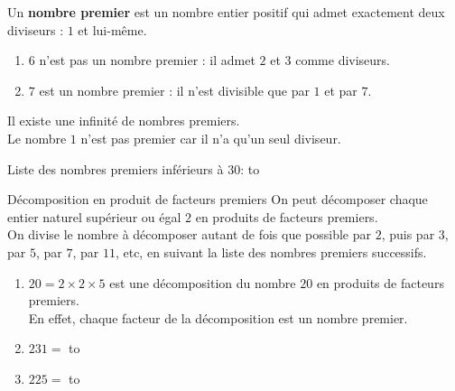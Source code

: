 \documentclass[12pt]{article}
\newif\iftrou\troutrue
\newlength{\trouwidth}
\newcommand{\trou}[1]{%
	\iftrou%
	\settowidth{\trouwidth}{#1}%
	\hbox to \trouwidth{\dotfill}%
	\else%
	#1%
	\fi}
\begin{document}
\begin{defin}{}{}
	Un \textbf{nombre premier} est un nombre entier positif qui admet exactement deux diviseurs : $1$ et lui-même.
\end{defin}

\begin{ex}{}{}
\begin{enumerate}
	\item $6$ n'est pas un nombre premier : il admet $2$ et $3$ comme diviseurs.
	\item $7$ est un nombre premier : il n'est divisible que par $1$ et par $7$.
\end{enumerate}
\end{ex}

\begin{rem}{}{}
	Il existe une infinité de nombres premiers.\\
	Le nombre $1$ n’est pas premier car il n’a qu’un seul diviseur.
\end{rem}

\begin{prop}{}{}
Liste des nombres premiers inférieurs à $30$: \trou{$2$; $3$; $5$; $7$; $11$; $13$; $17$; $19$; $23$; $29$}
\end{prop}


\begin{prop}{Décomposition en produit de facteurs premiers}{}
On peut décomposer chaque entier naturel supérieur ou égal $2$ en produits de facteurs premiers.\\
On divise le nombre à décomposer autant de fois que possible par $2$, puis par $3$, par $5$, par $7$, par $11$, etc, en suivant la liste des nombres premiers successifs.\\
\end{prop}

\begin{ex}{}{}
	\begin{enumerate}
		\item 
	$20 = 2 \times 2 \times 5$ est une décomposition du nombre $20$ en produits de facteurs premiers. \\
	En effet, chaque facteur de la décomposition est un nombre premier. 
	\item  $231 =$ \trou{$3 \times 7 \times 11$}
	\item $225 =$ \trou{$3 \times 3 \times 5 \times 5$}
		\end{enumerate}
\end{ex}


\newpage
\end{document}
